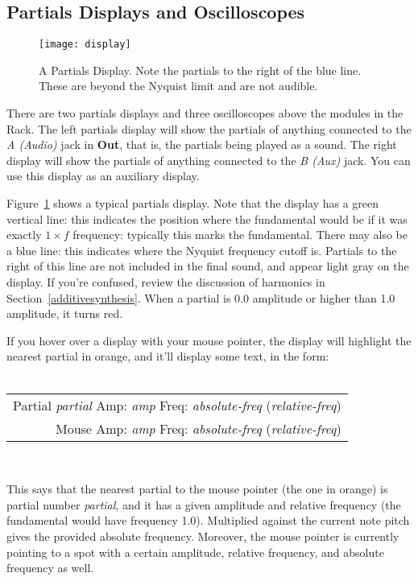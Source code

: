 \documentclass{article}
\begin{document}
\enlargethispage{1em}

\subsection{Partials Displays and Oscilloscopes}

\begin{wrapfigure}{r}{3in}
\vspace{-1em}
\texttt{[image: display]}
\caption{A Partials Display.  Note the partials to the right of the blue line.  These are beyond the Nyquist limit and are not audible.}
\label{display}
\end{wrapfigure}

There are two partials displays and three oscilloscopes above the modules in the Rack.  The left partials display will show the partials of anything connected to the {\it A (Audio)} jack in {\bf Out}, that is, the partials being played as a sound.  The right display will show the partials of anything connected to the {\it B (Aux)} jack.  You can use this display as an auxiliary display.

Figure~\ref{display} shows a typical partials display.  Note that the display has a green vertical line: this indicates the position where the fundamental would be if it was exactly \(1\times f\) frequency: typically this marks the fundamental.  There may also be a blue line: this indicates where the Nyquist frequency cutoff is. Partials to the right of this line are not included in the final sound, and appear light gray on the display.  If you're confused, review the discussion of harmonics in Section~\ref{additivesynthesis}.  When a partial is 0.0 amplitude or higher than 1.0 amplitude, it turns red.

If you hover over a display with your mouse pointer, the display will highlight the nearest partial in orange, and it'll display some text, in the form:\\
\\
{\small
\begin{tabular}{@{\hspace{1in}}r}
Partial {\it partial}  Amp: {\it amp}  Freq: {\it absolute-freq} ({\it relative-freq})\\
Mouse  Amp: {\it amp}  Freq: {\it absolute-freq} ({\it relative-freq})\\
\end{tabular}\\
}

This says that the nearest partial to the mouse pointer (the one in orange) is partial number {\it partial}, and it has a given amplitude and relative frequency (the fundamental would have frequency 1.0).  Multiplied against the current note pitch gives the provided absolute frequency.  Moreover, the mouse pointer is currently pointing to a spot with a certain amplitude, relative frequency, and absolute frequency as well.
\end{document}
